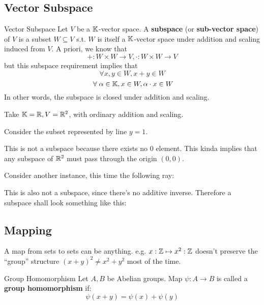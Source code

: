 \subsection{Vector Subspace}
\begin{definition} {Vector Subspace}
    Let \(V\) be a \(\mathbb{K}\)-vector space. A \textbf{subspace} (or \textbf{sub-vector space}) of \(V\) is a subset \(W \subseteq V\) s.t. \(W\) is itself a \(\mathbb{K}\)-vector space under addition and scaling induced from \(V\). A priori, we know that \[
        + : W \times W \to V, \cdot: W \times W \to V
    \]
    but this subspace requirement implies that
    \[
        \forall x, y \in W, x+y \in W
    \]
    \[
        \forall \alpha \in \bbk, x \in W, \alpha \cdot x \in W
    \]
    In other words, the subspace is closed under addition and scaling.
\end{definition}

\begin{example}
    Take \(\mathbb{K} = \mathbb{R}, V = \mathbb{R}^2\), with ordinary addition and scaling.

    Consider the subset represented by line \(y = 1\).
    

    This is not a subspace because there exists no 0 element. This kinda implies that any subspace of \(\mathbb{R}^2\) must pass through the origin \((0, 0)\).

    Consider another instance, this time the following ray:
    
    This is also not a subspace, since there's no additive inverse. Therefore a subspace shall look something like this:
    
\end{example}
\subsection{Mapping}
\begin{motivation}
    A map from sets to sets can be anything. e.g. \(x:\mathbb{Z} \mapsto x^2:\mathbb{Z}\) doesn't preserve the ``group'' structure \((x+y) ^2 \neq x^2 + y^2\) most of the time.
\end{motivation}

\begin{definition} {Group Homomorphism}
    Let \(A, B\) be Abelian groups. Map \(\psi: A \to B\) is called a \textbf{group homomorphism} if: \[
        \psi (x + y) = \psi (x) + \psi (y)
    \]
\end{definition}

